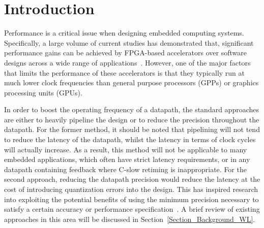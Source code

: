 \documentclass[prodmode,acmtrets]{acmsmall} %
\begin{document}
\maketitle


\section{Introduction}

Performance is a critical issue when designing embedded computing systems. Specifically, a large volume of current studies has demonstrated that, significant performance gains can be achieved by FPGA-based accelerators over software designs across a wide range of applications~\cite{UnderwoodFPGAvsCPU,David_MINRES}. However, one of the major factors that limits the performance of these accelerators is that they typically run at much lower clock frequencies than general purpose processors (GPPs) or graphics processing units (GPUs).

In order to boost the operating frequency of a datapath, the standard approaches are either to heavily pipeline the design or to reduce the precision throughout the datapath. For the former method, it should be noted that pipelining will not tend to reduce the latency of the datapath, whilst the latency in terms of clock cycles will actually increase. As a result, this method will not be applicable to many embedded applications, which often have strict latency requirements, or in any datapath containing feedback where C-slow retiming is inappropriate. For the second approach, reducing the datapath precision would reduce the latency at the cost of introducing quantization errors into the design. This has inspired research into exploiting the potential benefits of using the minimum precision necessary to satisfy a certain accuracy or performance specification~\cite{GeorgeDT11}. A brief review of existing approaches in this area will be discussed in Section~\ref{Section_Background_WL}.
\end{document}
